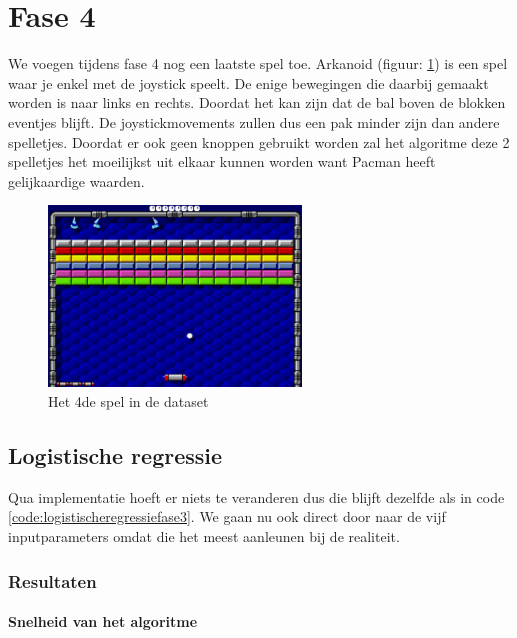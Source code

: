 
\newpage
\section{Fase 4}
\label{sec:Fase4}

We voegen tijdens fase 4 nog een laatste spel toe. Arkanoid (figuur: \ref{fig:akranoid}) is een spel waar je enkel met de joystick speelt. De enige bewegingen die daarbij gemaakt worden is naar links en rechts. Doordat het kan zijn dat de bal boven de blokken eventjes blijft. De joystickmovements zullen dus een pak minder zijn dan andere spelletjes. Doordat er ook geen knoppen gebruikt worden zal het algoritme deze 2 spelletjes het moeilijkst uit elkaar kunnen worden want Pacman heeft gelijkaardige waarden. 

\begin{figure}[]
	\centering
	\includegraphics[width=0.6\textwidth]{img/arkanoid.png}
	\caption{Het 4de spel in de dataset}
	\label{fig:akranoid}
\end{figure}

\subsection{Logistische regressie}
\label{sec:Logistischeregressie-fase4}

Qua implementatie hoeft er niets te veranderen dus die blijft dezelfde als in code \ref{code:logistischeregressiefase3}. We gaan nu ook direct door naar de vijf inputparameters omdat die het meest aanleunen bij de realiteit. 

\subsubsection{Resultaten}
\paragraph{Snelheid van het algoritme} 

